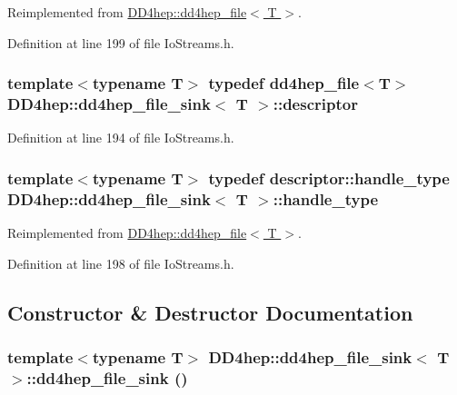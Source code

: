 Reimplemented from \hyperlink{class_d_d4hep_1_1dd4hep__file_aef4242f7f2fe15a59f7bf7a8f6ba24d5}{DD4hep::dd4hep\_\-file$<$ T $>$}.

Definition at line 199 of file IoStreams.h.\hypertarget{class_d_d4hep_1_1dd4hep__file__sink_adf4c7b626a18fe2fdaf8a8fb6bf5ea3b}{
\subsubsection[{descriptor}]{\setlength{\rightskip}{0pt plus 5cm}template$<$typename T$>$ typedef {\bf dd4hep\_\-file}$<${\bf T}$>$ {\bf DD4hep::dd4hep\_\-file\_\-sink}$<$ {\bf T} $>$::{\bf descriptor}}}
\label{class_d_d4hep_1_1dd4hep__file__sink_adf4c7b626a18fe2fdaf8a8fb6bf5ea3b}


Definition at line 194 of file IoStreams.h.\hypertarget{class_d_d4hep_1_1dd4hep__file__sink_a660f6328d32832c96f2b59afb2164214}{
\subsubsection[{handle\_\-type}]{\setlength{\rightskip}{0pt plus 5cm}template$<$typename T$>$ typedef {\bf descriptor::handle\_\-type} {\bf DD4hep::dd4hep\_\-file\_\-sink}$<$ {\bf T} $>$::{\bf handle\_\-type}}}
\label{class_d_d4hep_1_1dd4hep__file__sink_a660f6328d32832c96f2b59afb2164214}


Reimplemented from \hyperlink{class_d_d4hep_1_1dd4hep__file_a4d79f8d433cd7831ff818691424cd6fc}{DD4hep::dd4hep\_\-file$<$ T $>$}.

Definition at line 198 of file IoStreams.h.

\subsection{Constructor \& Destructor Documentation}
\hypertarget{class_d_d4hep_1_1dd4hep__file__sink_ab8a6a3d1d07d6d0488305e3a961961b2}{
\subsubsection[{dd4hep\_\-file\_\-sink}]{\setlength{\rightskip}{0pt plus 5cm}template$<$typename T$>$ {\bf DD4hep::dd4hep\_\-file\_\-sink}$<$ {\bf T} $>$::{\bf dd4hep\_\-file\_\-sink} ()}}
\label{class_d_d4hep_1_1dd4hep__file__sink_ab8a6a3d1d07d6d0488305e3a961961b2}


